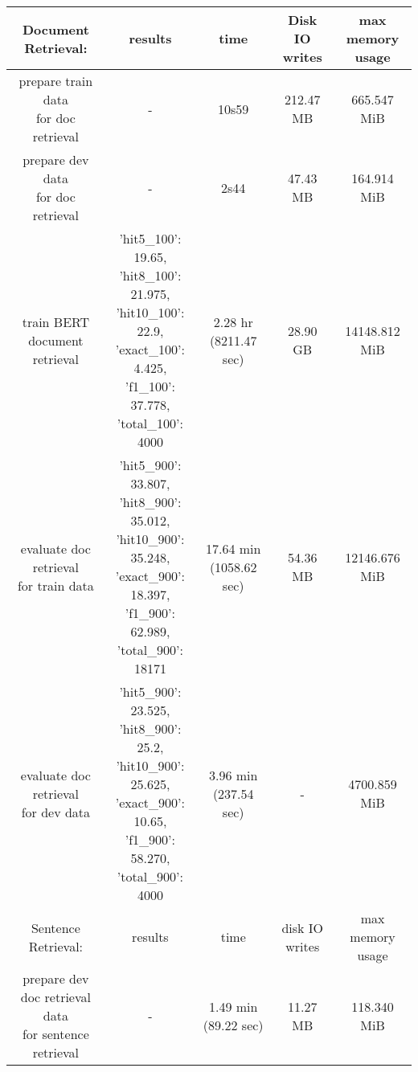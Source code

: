 \begin{table}[htpb!]

\footnotesize
\begin{tabular}{c c c c c}
    \hline
    Document Retrieval:	& results & time & Disk IO writes & \makecell[l]{max memory \\ usage} \\
    \hline
    \makecell[l]{prepare train data \\ for doc retrieval} & - & 10s59 & 212.47 MB & 665.547 MiB \\
    \makecell[l]{prepare dev data \\ for doc retrieval}	& - & 	2s44 &	47.43 MB & 164.914 MiB \\
    \makecell[l]{train BERT \\ document retrieval} & \makecell[l]{'hit5\_100': 19.65, \\'hit8\_100': 21.975, \\ 'hit10\_100': 22.9, \\ 'exact\_100': 4.425, \\ 'f1\_100': 37.778, \\ 'total\_100': 4000} & 2.28 hr (8211.47 sec) & 28.90 GB & 14148.812 MiB \\
    \makecell[l]{evaluate doc retrieval \\ for train data} &	\makecell[l]{'hit5\_900': 33.807, \\ 'hit8\_900': 35.012, \\ 'hit10\_900': 35.248, \\ 'exact\_900': 18.397, \\ 'f1\_900': 62.989, \\ 'total\_900': 18171}	& 17.64 min (1058.62 sec) & 54.36 MB & 12146.676 MiB \\
    \makecell[l]{evaluate doc retrieval \\ for dev data}	& \makecell[l]{'hit5\_900': 23.525, \\ 'hit8\_900': 25.2, \\ 'hit10\_900': 25.625, \\ 'exact\_900': 10.65, \\ 'f1\_900': 58.270, \\ 'total\_900': 4000} & 3.96 min (237.54 sec)	& - & 4700.859 MiB \\
    \hline
    Sentence Retrieval:	& results &	time & disk IO writes & max memory usage \\
    \hline
    \makecell[l]{prepare dev doc retrieval data \\ for sentence retrieval}	& - & 1.49 min (89.22 sec) & 11.27 MB& 118.340 MiB \\

\end{tabular}
\end{table}

